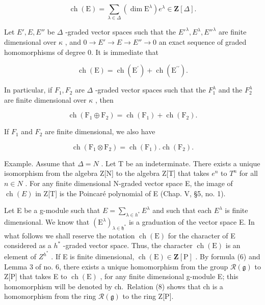 \[
\operatorname{ch} (\mathrm{E}) = \sum_ {\lambda \in \Delta} (\dim \mathrm{E} ^ {\lambda}) e ^ {\lambda} \in \mathbf {Z} [ \Delta ].\tag{5}
\]

Let \(E', E, E''\) be \(\Delta\) -graded vector spaces such that the \(E'^{\lambda}, E^{\lambda}, E''^{\lambda}\) are finite dimensional over \(\kappa\) , and \(0 \longrightarrow E' \longrightarrow E \longrightarrow E'' \longrightarrow 0\) an exact sequence of graded homomorphisms of degree 0. It is immediate that

\[
\operatorname{ch} (\mathrm{E}) = \operatorname{ch} (\mathrm{E} ^ {\prime}) + \operatorname{ch} (\mathrm{E} ^ {\prime \prime}).\tag{6}
\]

In particular, if \(F_{1}, F_{2}\) are \(\Delta\) -graded vector spaces such that the \(F_{1}^{\lambda}\) and the \(F_{2}^{\lambda}\) are finite dimensional over \(\kappa\) , then

\[
\operatorname{ch} \left(\mathrm{F} _ {1} \oplus \mathrm{F} _ {2}\right) = \operatorname{ch} \left(\mathrm{F} _ {1}\right) + \operatorname{ch} \left(\mathrm{F} _ {2}\right).\tag{7}
\]

If \(F_{1}\) and \(F_{2}\) are finite dimensional, we also have

\[
\operatorname{ch} \left(\mathrm{F} _ {1} \otimes \mathrm{F} _ {2}\right) = \operatorname{ch} \left(\mathrm{F} _ {1}\right). \operatorname{ch} \left(\mathrm{F} _ {2}\right).\tag{8}
\]

Example. Assume that \(\Delta = N\) . Let T be an indeterminate. There exists a unique isomorphism from the algebra Z{[}N{]} to the algebra Z{[}T{]} that takes \(e^{n}\) to \(T^{n}\) for all \(n \in N\) . For any finite dimensional N-graded vector space E, the image of \(\operatorname{ch}(E)\) in Z{[}T{]} is the Poincaré polynomial of E (Chap. V, §5, no. 1).

Let E be a g-module such that \(E = \sum_{\lambda \in h^{*}} E^{\lambda}\) and such that each \(E^{\lambda}\) is finite dimensional. We know that \((\mathrm{E}^{\lambda})_{\lambda \in \mathfrak{h}^{*}}\) is a graduation of the vector space E. In what follows we shall reserve the notation \(\operatorname{ch}(\mathrm{E})\) for the character of E considered as a \(h^{*}\) -graded vector space. Thus, the character \(\operatorname{ch}(\mathrm{E})\) is an element of \(Z^{h^{*}}\) . If E is finite dimensional, \(\operatorname{ch}(\mathrm{E}) \in \mathbf{Z}[\mathrm{P}]\) . By formula (6) and Lemma 3 of no. 6, there exists a unique homomorphism from the group \(\mathcal{R}(\mathfrak{g})\) to Z{[}P{]} that takes E to \(\operatorname{ch}(\mathrm{E})\) , for any finite dimensional g-module E; this homomorphism will be denoted by ch.~Relation (8) shows that ch is a homomorphism from the ring \(\mathcal{R}(\mathfrak{g})\) to the ring Z{[}P{]}.

